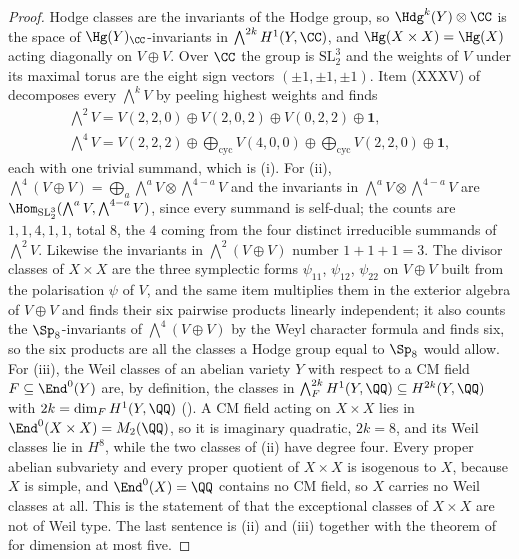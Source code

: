 \begin{proof}
Hodge classes are the invariants of the Hodge group, so
$\Hdg^{k}(Y)\otimes\CC$ is the space of $\Hg(Y)_{\CC}$-invariants in
$\bigwedge^{2k}H^{1}(Y,\CC)$, and $\Hg(X\times X)=\Hg(X)$ acting
diagonally on $V\oplus V$. Over $\CC$ the group is
$\mathrm{SL}_{2}^{3}$ and the weights of $V$ under its maximal torus are the
eight sign vectors $(\pm1,\pm1,\pm1)$. Item (XXXV) of 
decomposes every $\bigwedge^{k}V$ by peeling highest weights and finds
\begin{gather*}
  \textstyle\bigwedge^{2}V=V(2,2,0)\oplus V(2,0,2)\oplus V(0,2,2)\oplus\mathbf{1},\\
  \textstyle\bigwedge^{4}V=V(2,2,2)\oplus\bigoplus_{\text{cyc}}V(4,0,0)
  \oplus\bigoplus_{\text{cyc}}V(2,2,0)\oplus\mathbf{1},
\end{gather*}
each with one trivial summand, which is (i). For (ii),
$\bigwedge^{4}(V\oplus V)=\bigoplus_{a}\bigwedge^{a}V\otimes\bigwedge^{4-a}V$
and the invariants in $\bigwedge^{a}V\otimes\bigwedge^{4-a}V$ are
$\Hom_{\mathrm{SL}_{2}^{3}}(\bigwedge^{a}V,\bigwedge^{4-a}V)$, since every
summand is self-dual; the counts are $1,1,4,1,1$, total $8$, the $4$ coming
from the four distinct irreducible summands of $\bigwedge^{2}V$. Likewise the
invariants in $\bigwedge^{2}(V\oplus V)$ number $1+1+1=3$. The divisor
classes of $X\times X$ are the three symplectic forms $\psi_{11}$, $\psi_{12}$,
$\psi_{22}$ on $V\oplus V$ built from the polarisation $\psi$ of $V$, and the
same item multiplies them in the exterior algebra of $V\oplus V$ and finds
their six pairwise products linearly independent; it also counts the
$\Sp_{8}$-invariants of $\bigwedge^{4}(V\oplus V)$ by the Weyl character
formula and finds six, so the six products are all the classes a Hodge group
equal to $\Sp_{8}$ would allow. For (iii), the Weil classes of an abelian
variety $Y$ with respect to a CM field $F\subseteq\End^{0}(Y)$ are, by
definition, the classes in $\bigwedge^{2k}_{F}H^{1}(Y,\QQ)\subseteq
H^{2k}(Y,\QQ)$ with $2k=\dim_{F}H^{1}(Y,\QQ)$ (). A CM
field acting on $X\times X$ lies in $\End^{0}(X\times X)=M_{2}(\QQ)$, so it is
imaginary quadratic, $2k=8$, and its Weil classes lie in $H^{8}$, while the two
classes of (ii) have degree four. Every proper
abelian subvariety and every proper quotient of $X\times X$ is isogenous to
$X$, because $X$ is simple, and $\End^{0}(X)=\QQ$ contains no CM field, so $X$
carries no Weil classes at all. This is the statement of \cite[0.1(iii)]{MZ99}
that the exceptional classes of $X\times X$ are not of Weil type. The last
sentence is (ii) and (iii) together with the theorem of \cite{MZ99} for
dimension at most five.
\end{proof}

